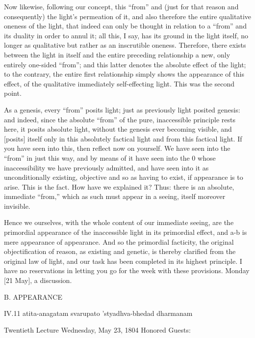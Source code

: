 Now likewise, following our concept,
this “from” and (just for that reason and consequently)
the light's permeation of it,
and also therefore the entire
qualitative oneness of the light,
that indeed can only be thought in relation to
a “from” and its duality in order to annul it;
all this, I say, has its ground in the light itself,
no longer as qualitative but rather as an inscrutible oneness.
Therefore, there exists between the light in itself and
the entire preceding relationship
a new, only entirely one-sided “from”;
and this latter denotes the absolute effect of the light;
to the contrary, the entire first relationship simply shows
the appearance of this effect,
of the qualitative immediately self-effecting light.
This was the second point.

As a genesis, every “from” posits light;
just as previously light posited genesis:
and indeed, since the absolute “from” of
the pure, inaccessible principle rests here,
it posits absolute light,
without the genesis ever becoming visible,
and [posits] itself only
in this absolutely factical light
and from this factical light.
If you have seen into this,
then reflect now on yourself.
We have seen into the “from” in just this way,
and by means of it have seen into the 0
whose inaccessibility we have previously admitted,
and have seen into it as unconditionally existing,
objective and so as having to exist,
if appearance is to arise.
This is the fact.
How have we explained it?
Thus: there is an absolute, immediate “from,”
which as such must appear in a seeing,
itself moreover invisible.

Hence we ourselves,
with the whole content
of our immediate seeing,
are the primordial appearance
of the inaccessible light
in its primordial effect,
and a-b is mere appearance of appearance.
And so the primordial facticity,
the original objectification of reason,
as existing and genetic, is thereby clarified
from the original law of light,
and our task has been completed
in its highest principle.
I have no reservations in letting you go
for the week with these provisions.
Monday [21 May], a discussion.

B. APPEARANCE

IV.11
atita-anagatam svarupato 'styadhva-bhedad dharmanam

Twentieth Lecture
Wednesday, May 23, 1804
Honored Guests:

